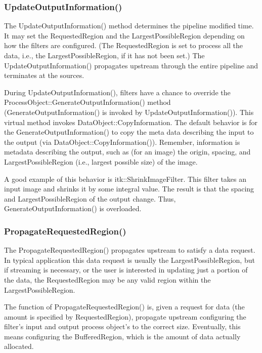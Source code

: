 \subsubsection{UpdateOutputInformation()}
\label{sec:UpdateOutputInformation}

The UpdateOutputInformation() method determines the pipeline modified
time. It may set the RequestedRegion and the LargestPossibleRegion depending
on how the filters are configured. (The RequestedRegion is set to process all
the data, i.e., the LargestPossibleRegion, if it has not been set.) The
UpdateOutputInformation() propagates upstream through the entire pipeline and
terminates at the sources.

During UpdateOutputInformation(), filters have a chance to override the
ProcessObject::GenerateOutputInformation() method
(GenerateOutputInformation() is invoked by UpdateOutputInformation()). This
virtual method invokes DataObject::CopyInformation. The default behavior is
for the GenerateOutputInformation() to copy the meta data describing the
input to the output (via DataObject::CopyInformation()). Remember,
information is metadata describing the output, such as (for an image) the
origin, spacing, and LargestPossibleRegion (i.e., largest possible size) of
the image.

A good example of this behavior is itk::ShrinkImageFilter. This filter takes
an input image and shrinks it by some integral value. The result is that the
spacing and LargestPossibleRegion of the output change. Thus,
GenerateOutputInformation() is overloaded.

\subsubsection{PropagateRequestedRegion()}
\label{sec:PropagateRequestedRegion}

The PropagateRequestedRegion() propagates upstream to satisfy a data
request. In typical application this data request is usually the
LargestPossibleRegion, but if streaming is necessary, or the user is
interested in updating just a portion of the data, the RequestedRegion may be
any valid region within the LargestPossibleRegion.

The function of PropagateRequestedRegion() is, given a request for data (the
amount is specified by RequestedRegion), propagate upstream configuring the
filter's input and output process object's to the correct size. Eventually,
this means configuring the BufferedRegion, which is the amount of data
actually allocated.

